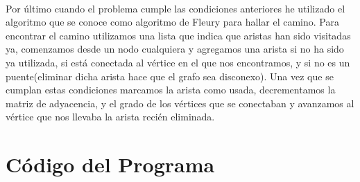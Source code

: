 \documentclass[es]{ifirak}
\begin{document}
\paragraph{}
Por último cuando el problema cumple las condiciones anteriores he utilizado el algoritmo que se conoce como algoritmo de Fleury para hallar el camino. Para encontrar el camino utilizamos una lista que indica que aristas han sido visitadas ya, comenzamos desde un nodo cualquiera y agregamos una arista si no ha sido ya utilizada, si está conectada al vértice en el que nos encontramos, y si no es un puente(eliminar dicha arista hace que el grafo sea disconexo). Una vez que se cumplan estas condiciones marcamos la arista como usada, decrementamos la matriz de adyacencia, y el grado de los vértices que se conectaban y avanzamos al vértice que nos llevaba la arista recién eliminada.

\section{Código del Programa}
\end{document}
